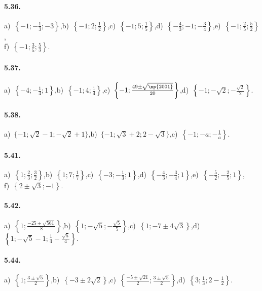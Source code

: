 \paragraph{5.36.} a)~$\left\{-1;-\frac 1 3;-3\right\}$,\quad b)~$\left\{-1;2;\frac 1 2 \right\}$,\quad c)~$\left\{-1;5;\frac 1 5\right\}$,\quad d)~$\left\{-\frac 4 3;-1;-\frac 3 4\right\}$,\quad e)~$\left\{-1;\frac 2 5;\frac 5 2\right\}$,\protect \\
f)~$\left\{-1;\frac 3 5;\frac 5 3\right\}$.

\paragraph{5.37.} a)~$\left\{-4;-\frac 1 4;1\right\}$,\quad b)~$\left\{-1;4;\frac 1 4\right\}$,\quad c)~$\left\{-1;\frac{49\pm \sqrt{\np{2001}}}{20}\right\}$,\quad d)~$\left\{-1;-\sqrt 2;-\frac{\sqrt 2} 2\right\}$.

\paragraph{5.38.} a)~$\{-1;\sqrt 2-1;-\sqrt 2+1\}$,\quad b)~$\{-1;\sqrt 3+2;2-\sqrt 3\}$,\quad c)~$\left\{-1;-a;-\frac 1 a\right\}$.

\paragraph{5.41.} a)~$\left\{1;\frac 2 3;\frac 3 2\right\}$,\quad b)~$\left\{1;7;\frac 1 7\right\}$,\quad c)~$\left\{-3;-\frac 1 3;1\right\}$,\quad d)~$\left\{-\frac 4 3;-\frac 3 4;1\right\}$,\quad e)~$\left\{-\frac 5 2;-\frac 2 5;1\right\}$,\protect\\ f)~$\left\{2\pm\sqrt 3;-1\right\}$.

\paragraph{5.42.} a)~$\left\{1;\frac{-25\pm \sqrt{561}} 8\right\}$,\quad b)~$\left\{1;-\sqrt 5;-\frac{\sqrt 5} 5\right\}$,\quad c)~$\left\{1;-7\pm 4\sqrt 3\right\}$,\quad d)~$\left\{1;-\sqrt 5-1;\frac 1 4-\frac{\sqrt 5} 4\right\}$.

\paragraph{5.44.} a)~$\left\{1;\frac{3\pm \sqrt 5} 2\right\}$,\quad b)~$\left\{-3\pm 2\sqrt 2\right\}$,\quad c)~$\left\{\frac{-5\pm \sqrt{21}} 2;\frac{3\pm \sqrt 5} 2\right\}$,\quad d)~$\left\{3;\frac 1 3;2-\frac 1 2\right\}$.

